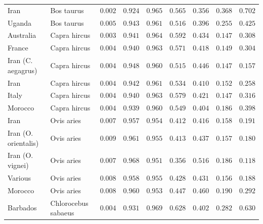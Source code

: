 \documentclass{article}
\begin{document}
\begin{center}
\begin{adjustbox}{width=\textwidth}
\begin{tabular}{||l|l|r||r|r||r|r||r|r||}
                Iran               & Bos taurus        & $ 0.002$ & $ 0.924$ & $ 0.965$ & $ 0.565$ & $ 0.356$ & $ 0.368$ & $ 0.702$ \\
                Uganda              & Bos taurus        & $ 0.005$ & $ 0.943$ & $ 0.961$ & $ 0.516$ & $ 0.396$ & $ 0.255$ & $ 0.425$ \\
                \rowcolor{LIGHTGREY} Australia            & Capra hircus        & $ 0.003$ & $ 0.941$ & $ 0.964$ & $ 0.592$ & $ 0.434$ & $ 0.147$ & $ 0.308$ \\
                \rowcolor{LIGHTGREY} France                                    & Capra hircus          & $ 0.004$ & $ 0.940$ & $ 0.963$ & $ 0.571$ & $ 0.418$ & $ 0.149$ & $ 0.304$ \\
                \rowcolor{LIGHTGREY} Iran (C. aegagrus)                    & Capra hircus          & $ 0.004$ & $ 0.948$ & $ 0.960$ & $ 0.515$ & $ 0.446$ & $ 0.147$ & $ 0.157$ \\
                \rowcolor{LIGHTGREY} Iran                        & Capra hircus          & $ 0.004$ & $ 0.942$ & $ 0.961$ & $ 0.534$ & $ 0.410$ & $ 0.152$ & $ 0.258$ \\
                \rowcolor{LIGHTGREY} Italy                                 & Capra hircus          & $ 0.004$ & $ 0.940$ & $ 0.963$ & $ 0.579$ & $ 0.421$ & $ 0.147$ & $ 0.316$ \\
                \rowcolor{LIGHTGREY} Morocco                                 & Capra hircus          & $ 0.004$ & $ 0.939$ & $ 0.960$ & $ 0.549$ & $ 0.404$ & $ 0.186$ & $ 0.398$ \\
                Iran           & Ovis aries & $ 0.007$ & $ 0.957$ & $ 0.954$ & $ 0.412$ & $ 0.416$ & $ 0.158$ & $ 0.191$ \\
                Iran (O. orientalis)  & Ovis aries & $ 0.009$ & $ 0.961$ & $ 0.955$ & $ 0.413$ & $ 0.437$ & $ 0.157$ & $ 0.180$ \\
                Iran (O. vignei)           & Ovis aries & $ 0.007$ & $ 0.968$ & $ 0.951$ & $ 0.356$ & $ 0.516$ & $ 0.186$ & $ 0.118$ \\
                Various             & Ovis aries & $ 0.008$ & $ 0.958$ & $ 0.955$ & $ 0.428$ & $ 0.431$ & $ 0.156$ & $ 0.188$ \\
                Morocco              & Ovis aries & $ 0.008$ & $ 0.960$ & $ 0.953$ & $ 0.447$ & $ 0.460$ & $ 0.190$ & $ 0.292$ \\
                \rowcolor{LIGHTGREY} Barbados              & Chlorocebus sabaeus & $ 0.004$ & $ 0.931$ & $ 0.969$ & $ 0.628$ & $ 0.402$ & $ 0.282$ & $ 0.630$ \\

\end{tabular}
\end{adjustbox}
\end{center}
\end{document}
